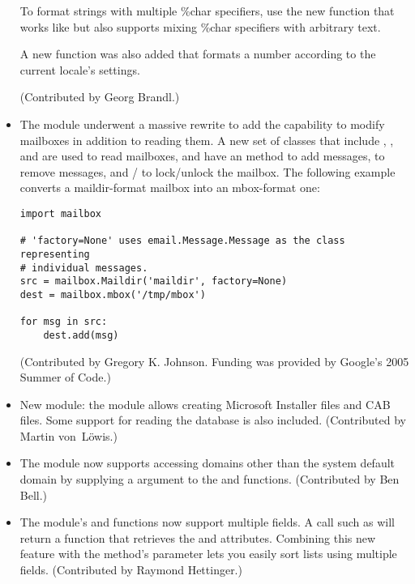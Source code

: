 \documentclass{howto}
\begin{document}
\begin{itemize}
To format strings with multiple \%char specifiers, use the new
 function that works like 
but also supports mixing \%char specifiers with
arbitrary text.

A new  function was also added that formats a
number according to the current locale's settings.

(Contributed by Georg Brandl.)

\item The  module underwent a massive rewrite to add
the capability to modify mailboxes in addition to reading them.  A new
set of classes that include , , and
 are used to read mailboxes, and have an
 method to add messages,
 to remove messages, and
/ to lock/unlock the mailbox.  The
following example converts a maildir-format mailbox into an mbox-format one:

\begin{verbatim}
import mailbox

# 'factory=None' uses email.Message.Message as the class representing
# individual messages.
src = mailbox.Maildir('maildir', factory=None)
dest = mailbox.mbox('/tmp/mbox')

for msg in src:
    dest.add(msg)
\end{verbatim}

(Contributed by Gregory K. Johnson.  Funding was provided by Google's
2005 Summer of Code.)

\item New module: the  module allows creating
Microsoft Installer  files and CAB files.  Some support
for reading the  database is also included.
(Contributed by Martin von~L\"owis.)

\item The  module now supports accessing domains other
than the system default domain by supplying a  argument to
the  and  functions.
(Contributed by Ben Bell.)

\item The  module's  
and  functions now support multiple fields.  
A call such as 
will return a function 
that retrieves the  and  attributes.  Combining 
this new feature with the  method's  parameter 
lets you easily sort lists using multiple fields.
(Contributed by Raymond Hettinger.)


\end{itemize}
\end{document}
